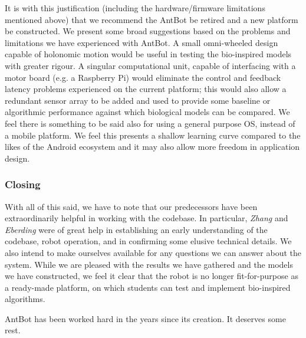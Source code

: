 \documentclass[a4paper,11pt,twoside,openright]{article}
\begin{document}
It is with this justification (including the hardware/firmware
limitations mentioned above) that we recommend the AntBot be retired
and a new platform be constructed. We present some broad suggestions
based on the problems and limitations we have experienced with
AntBot. A small omni-wheeled design capable of holonomic motion would
be useful in testing the bio-inspired models with greater rigour. A
singular computational unit, capable of interfacing with a motor board
(e.g. a Raspberry Pi) would eliminate the control and feedback latency
problems experienced on the current platform; this would also allow a
redundant sensor array to be added and used to provide some baseline
or algorithmic performance against which biological models can be
compared. We feel there is something to be said also for using a
general purpose OS, instead of a mobile platform. We feel this
presents a shallow learning curve compared to the likes of the Android
ecosystem and it may also allow more freedom in application
design.

\subsubsection{Closing}
With all of this said, we have to note that our predecessors have been
extraordinarily helpful in working with the codebase. In particular,
\textit{Zhang} and \textit{Eberding} were of great help in
establishing an early understanding of the codebase, robot operation,
and in confirming some elusive technical details. We also intend to
make ourselves available for any questions we can answer about the
system. While we are pleased with the results we have gathered and the
models we have constructed, we feel it clear that the robot is no longer
fit-for-purpose as a ready-made platform, on which students can test
and implement bio-inspired algorithms.
\newline\par

AntBot has been worked hard in the years since its creation. It
deserves some rest.



\end{document}

